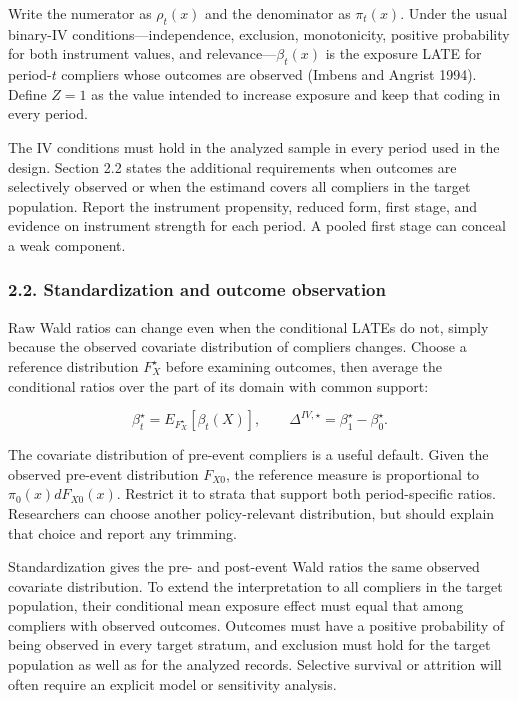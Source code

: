 \documentclass[
  11pt,
]{article}
\begin{document}
Write the numerator as \(\rho_t(x)\) and the denominator as
\(\pi_t(x)\). Under the usual binary-IV conditions---independence,
exclusion, monotonicity, positive probability for both instrument
values, and relevance---\(\beta_t(x)\) is the exposure LATE for
period-\(t\) compliers whose outcomes are observed (Imbens and Angrist
1994). Define \(Z=1\) as the value intended to increase exposure and
keep that coding in every period.

The IV conditions must hold in the analyzed sample in every period used
in the design. Section 2.2 states the additional requirements when
outcomes are selectively observed or when the estimand covers all
compliers in the target population. Report the instrument propensity,
reduced form, first stage, and evidence on instrument strength for each
period. A pooled first stage can conceal a weak component.

\hypertarget{standardization-and-outcome-observation}{%
\subsubsection{2.2. Standardization and outcome
observation}\label{standardization-and-outcome-observation}}

Raw Wald ratios can change even when the conditional LATEs do not,
simply because the observed covariate distribution of compliers changes.
Choose a reference distribution \(F_X^\star\) before examining outcomes,
then average the conditional ratios over the part of its domain with
common support:

\[
\beta_t^\star=E_{F_X^\star}[\beta_t(X)],
\qquad
\Delta^{IV,\star}=\beta_1^\star-\beta_0^\star.
\tag{2}
\]

The covariate distribution of pre-event compliers is a useful default.
Given the observed pre-event distribution \(F_{X0}\), the reference
measure is proportional to \(\pi_0(x)dF_{X0}(x)\). Restrict it to strata
that support both period-specific ratios. Researchers can choose another
policy-relevant distribution, but should explain that choice and report
any trimming.

Standardization gives the pre- and post-event Wald ratios the same
observed covariate distribution. To extend the interpretation to all
compliers in the target population, their conditional mean exposure
effect must equal that among compliers with observed outcomes. Outcomes
must have a positive probability of being observed in every target
stratum, and exclusion must hold for the target population as well as
for the analyzed records. Selective survival or attrition will often
require an explicit model or sensitivity analysis.
\end{document}
